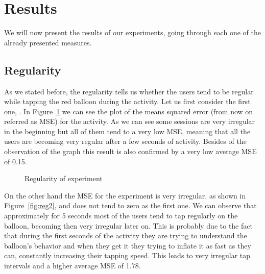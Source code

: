 \section{Results}
We will now present the results of our experiments, going through each one of the already presented measures.

\subsection{Regularity}
As we stated before, the regularity tells us whether the users tend to be regular while tapping the red balloon during the activity. Let us first consider the first one, \testfirst. In Figure~\ref{fig:reg1} we can see the plot of the means squared error (from now on referred as MSE) for the activity. As we can see some sessions are very irregular in the beginning but all of them tend to a very low MSE, meaning that all the users are becoming very regular after a few seconds of activity. Besides of the observation of the graph this result is also confirmed by a very low average MSE of 0.15.


\begin{figure}[h!t]
\centering
	{\setlength{\fboxsep}{1.5pt}
	 }
\caption{Regularity of \testfirst experiment}
\label{fig:reg1}
\end{figure}

On the other hand the MSE for the \testsecond experiment is very irregular, as shown in Figure~\ref{fig:reg2}, and does not tend to zero as the first one. We can observe that approximately for 5 seconds most of the users tend to tap regularly on the balloon, becoming then very irregular later on. This is probably due to the fact that during the first seconds of the activity they are trying to understand the balloon's behavior and when they get it they trying to inflate it as fast as they can, constantly increasing their tapping speed. This leads to very irregular tap intervals and a higher average MSE of 1.78.


